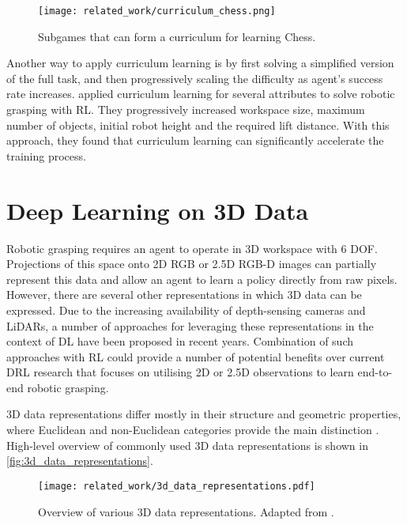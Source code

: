 \begin{figure}[ht]
    \centering
    \texttt{[image: related\_work/curriculum\_chess.png]}
    \caption{Subgames that can form a curriculum for learning Chess. \protect\cite{narvekar_curriculum_2020}}
    \label{fig:curriculum_chess}
\end{figure}

Another way to apply curriculum learning is by first solving a simplified version of the full task, and then progressively scaling the difficulty as agent's success rate increases. \citet{breyer_comparing_2019} applied curriculum learning for several attributes to solve robotic grasping with RL. They progressively increased workspace size, maximum number of objects, initial robot height and the required lift distance. With this approach, they found that curriculum learning can significantly accelerate the training process.


\section{Deep Learning on 3D Data}

Robotic grasping requires an agent to operate in 3D workspace with 6 DOF. Projections of this space onto 2D RGB or 2.5D RGB-D images can partially represent this data and allow an agent to learn a policy directly from raw pixels. However, there are several other representations in which 3D data can be expressed. Due to the increasing availability of depth-sensing cameras and LiDARs, a number of approaches for leveraging these representations in the context of DL have been proposed in recent years. Combination of such approaches with RL could provide a number of potential benefits over current DRL research that focuses on utilising 2D or 2.5D observations to learn end-to-end robotic grasping.

3D data representations differ mostly in their structure and geometric properties, where Euclidean and non-Euclidean categories provide the main distinction \cite{ahmed_deep_2018}. High-level overview of commonly used 3D data representations is shown in \autoref{fig:3d_data_representations}.

\begin{figure}[ht]
    \centering
    \texttt{[image: related\_work/3d\_data\_representations.pdf]}
    \caption{Overview of various 3D data representations. Adapted from \protect\citet{ahmed_deep_2018}.}
    \label{fig:3d_data_representations}
\end{figure}


